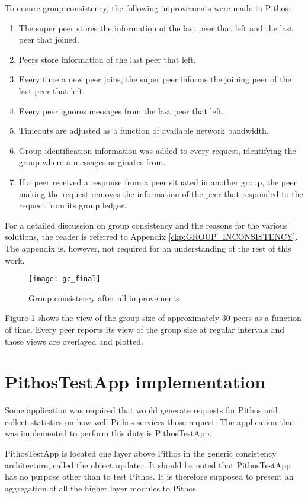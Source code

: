 To ensure group consistency, the following improvements were made to Pithos:
%
\begin{enumerate}
\item The super peer stores the information of the last peer that left and the last peer that joined.
\item Peers store information of the last peer that left.
\item Every time a new peer joins, the super peer informs the joining peer of the last peer that left.
\item Every peer ignores messages from the last peer that left.
\item Timeouts are adjusted as a function of available network bandwidth.
\item Group identification information was added to every request, identifying the group where a messages originates from.
\item If a peer received a response from a peer situated in another group, the peer making the request removes the information of the peer that responded to the request from its group ledger.
\end{enumerate}

For a detailed discussion on group consistency and the reasons for the various solutions, the reader is referred to Appendix \ref{chp:GROUP_INCONSISTENCY}. The appendix is, however, not required for an understanding of the rest of this work.

\begin{figure}[htbp]
 \centering
 \texttt{[image: gc\_final]}
 \caption{Group consistency after all improvements}
 \label{fig_gc_final}
\end{figure}
%
Figure \ref{fig_gc_final} shows the view of the group size of approximately 30 peers as a function of time. Every peer reports its view of the group size at regular intervals and those views are overlayed and plotted.

\section{PithosTestApp implementation}
\label{pithostestapp}

Some application was required that would generate requests for Pithos and collect statistics on how well Pithos services those request. The application that was implemented to perform this duty is PithosTestApp.

PithosTestApp is located one layer above Pithos in the generic consistency architecture, called the object updater. It should be noted that PithosTestApp has no purpose other than to test Pithos. It is therefore supposed to present an aggregation of all the higher layer modules to Pithos.

